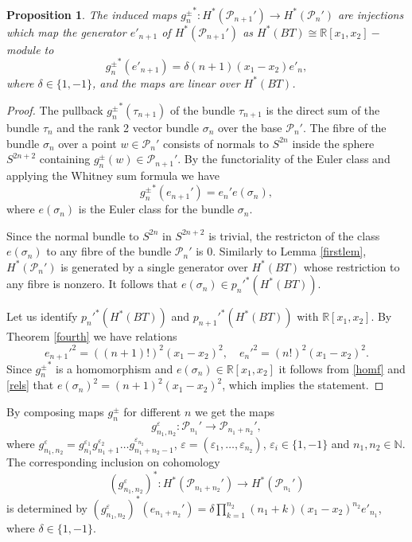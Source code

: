 \documentclass[11pt]{amsart}
\newtheorem{prop}[theorem]{Proposition}
\theoremstyle{definition}
\theoremstyle{remark}
\numberwithin{equation}{section}
\begin{document}
\begin{prop}
The induced maps ${g_n^{\pm}}^*\colon H^*({\mathcal P}_{n+1}') \to H^*({\mathcal P}_{n}')$ are injections which  map the generator $e'_{n+1}$ of $H^*({\mathcal P}_{n+1}')$ as $H^*(BT) \cong \mathbb R[x_1, x_2]-$module to   
$$
{g_n^\pm}^* (e'_{n+1}) = \delta (n+1) (x_1-x_2) e'_n, 
$$
where $\delta \in \{1, -1\}$, and the maps are linear over $H^*(BT)$.
\end{prop}
\begin{proof}
The pullback ${g_n^{\pm}}^*(\tau_{n+1})$ of the bundle $\tau_{n+1}$ is the direct sum of the bundle $\tau_n$ and the rank 2 vector bundle $\sigma_n$ over the base $\mathcal P_n'$. The fibre of the bundle $\sigma_n$ over a point $w\in \mathcal P_n'$ consists of normals to $S^{2n}$ inside the sphere $S^{2n+2}$ containing $g_n^{\pm}(w) \in \mathcal P_{n+1}'$. By the functoriality of the Euler class and applying the Whitney sum formula we have
\begin{equation}
\label{homf}
{g_n^{\pm}}^*(e_{n+1}')=e_n' e(\sigma_n),   
\end{equation}
where $e(\sigma_n)$ is the Euler class for the bundle $\sigma_n$. 

Since the normal bundle to $S^{2n}$ in $S^{2n+2}$ is trivial, the restricton of the class $e(\sigma_n)$ to any fibre of the bundle $\mathcal P_n'$ is 0. Similarly to Lemma \ref{firstlem}, $H^*(\mathcal P_n')$ is generated by a single generator over $H^*(BT)$ whose restriction to any fibre is nonzero. It follows that $e(\sigma_n) \in p_n'^*(H^*(BT))$. 

Let us identify $p_n'^*(H^*(BT))$ and $p_{n+1}'^*(H^*(BT))$ with $\mathbb R[x_1, x_2]$. By Theorem \ref{fourth} we have relations 
\begin{equation}
\label{rels}
e_{n+1}'^2=((n+1)!)^2(x_1-x_2)^2, \quad e_{n}'^2=(n!)^2(x_1-x_2)^2.   
\end{equation}
Since ${g_n^{\pm}}^*$ is a homomorphism and $e(\sigma_n) \in \mathbb R[x_1, x_2]$ it follows from \eqref{homf} and \eqref{rels} that
$e(\sigma_n)^2 = (n+1)^2(x_1-x_2)^2$, which implies the statement.
\end{proof}
By composing maps $g_n^\pm$ for different $n$ we get the maps
$$
g_{n_1, n_2}^\varepsilon\colon \mathcal P_{n_1}' \to \mathcal P_{n_1+n_2}',
$$
where $g_{n_1,n_2}^\varepsilon = g_{n_1}^{\varepsilon_1} g_{n_1+1}^{\varepsilon_2} \ldots g_{n_1+n_2-1}^{\varepsilon_{n_2}}$, $\varepsilon = (\varepsilon_1, \ldots, \varepsilon_{n_2})$, $\varepsilon_i \in \{1,-1\}$ and $n_1, n_2 \in \mathbb N$. The corresponding inclusion on cohomology
$$
(g_{n_1,n_2}^{\varepsilon})^*\colon H^*(\mathcal P_{n_1+n_2}') \to H^*(\mathcal P_{n_1}')
$$
is determined by $(g_{n_1, n_2}^\varepsilon)^*(e_{n_1+n_2}')=\delta \prod_{k=1}^{n_2} (n_1+k) (x_1-x_2)^{n_2} e'_{n_1}$, where $\delta \in \{1, -1\}$. 
\end{document}
